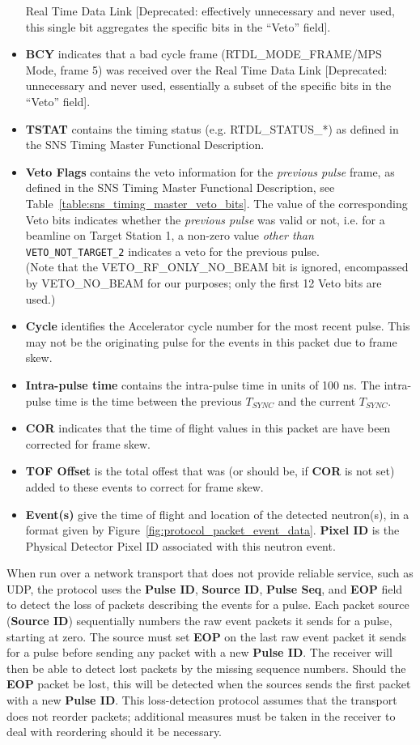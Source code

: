 \begin{itemize}
Real Time Data Link [Deprecated: effectively unnecessary and never used,
this single bit aggregates the specific bits in the ``Veto'' field].
\item{\bf BCY} indicates that a bad cycle frame
(RTDL\_MODE\_FRAME/MPS Mode, frame 5) was received over the
Real Time Data Link
[Deprecated: unnecessary and never used, essentially a subset of the
specific bits in the ``Veto'' field].
\item{\bf TSTAT} contains the timing status
(e.g. RTDL\_STATUS\_*) as defined in the SNS Timing Master
Functional Description.
\item{\bf Veto Flags} contains the veto information
for the {\it previous pulse} frame,
as defined in the SNS Timing Master Functional Description,
see Table~\ref{table:sns_timing_master_veto_bits}.
The value of the corresponding Veto bits indicates whether the
{\it previous pulse} was valid or not,
i.e. for a beamline on Target Station 1,
a non-zero value {\it other than } {\tt VETO\_NOT\_TARGET\_2}
indicates a veto for the previous pulse. \\
(Note that the VETO\_RF\_ONLY\_NO\_BEAM bit is ignored,
encompassed by VETO\_NO\_BEAM for our purposes;
only the first 12 Veto bits are used.)
\item{\bf Cycle} identifies the Accelerator cycle number for the most
recent pulse. This may not be the originating pulse for the events in this
packet due to frame skew.
\item{\bf Intra-pulse time} contains the intra-pulse time in units of 100 ns.
The intra-pulse time is the time between the previous $T_{SYNC}$ and the
current $T_{SYNC}$.
\item{\bf COR} indicates that the time of flight values in this packet are
have been corrected for frame skew.
\item{\bf TOF Offset} is the total offest that was (or should be, if {\bf COR}
is not set) added to these events to correct for frame skew.
\item{\bf Event(s)} give the time of flight and location of the detected
neutron(s), in a format given by Figure~\ref{fig:protocol_packet_event_data}.
{\bf Pixel ID} is the Physical Detector Pixel ID
associated with this neutron event.
\end{itemize}

When run over a network transport that does not provide reliable service, such
as UDP, the protocol uses the {\bf Pulse ID}, {\bf Source ID}, {\bf Pulse Seq},
and {\bf EOP} field to detect the loss of packets describing the events for a
pulse. Each packet source ({\bf Source ID}) sequentially numbers the raw event
packets it sends for a pulse, starting at zero. The source must set {\bf EOP}
on the last raw event packet it sends for a pulse before sending any packet
with a new {\bf Pulse ID}. The receiver will then be able to detect lost
packets by the missing sequence numbers. Should the {\bf EOP} packet be lost,
this will be detected when the sources sends the first packet with a new {\bf
Pulse ID}. This loss-detection protocol assumes that the transport does not
reorder packets; additional measures must be taken in the receiver
to deal with reordering should it be necessary.


